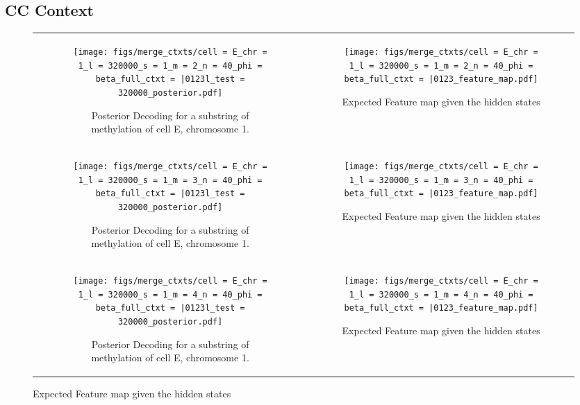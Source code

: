 \documentclass{article}
\begin{document}
\subsection{CC Context}

\begin{figure}[H]
    \begin{tabular}{cc}
      \begin{subfigure}[t]{0.4\textwidth}
        \texttt{[image: figs/merge\_ctxts/cell = E\_chr = 1\_l = 320000\_s = 1\_m = 2\_n = 40\_phi = beta\_full\_ctxt = |0123l\_test = 320000\_posterior.pdf]}
        \caption{Posterior Decoding for a substring of methylation of cell E, chromosome 1.}
      \end{subfigure}
      &
      \begin{subfigure}[t]{0.4\textwidth}
        \texttt{[image: figs/merge\_ctxts/cell = E\_chr = 1\_l = 320000\_s = 1\_m = 2\_n = 40\_phi = beta\_full\_ctxt = |0123\_feature\_map.pdf]}
        \caption{Expected Feature map given the hidden states}
      \end{subfigure}
      \\
      \begin{subfigure}[t]{0.4\textwidth}
        \texttt{[image: figs/merge\_ctxts/cell = E\_chr = 1\_l = 320000\_s = 1\_m = 3\_n = 40\_phi = beta\_full\_ctxt = |0123l\_test = 320000\_posterior.pdf]}
        \caption{Posterior Decoding for a substring of methylation of cell E, chromosome 1.}
      \end{subfigure}
      &
      \begin{subfigure}[t]{0.4\textwidth}
        \texttt{[image: figs/merge\_ctxts/cell = E\_chr = 1\_l = 320000\_s = 1\_m = 3\_n = 40\_phi = beta\_full\_ctxt = |0123\_feature\_map.pdf]}
        \caption{Expected Feature map given the hidden states}
      \end{subfigure}
      \\
      \begin{subfigure}[t]{0.4\textwidth}
        \texttt{[image: figs/merge\_ctxts/cell = E\_chr = 1\_l = 320000\_s = 1\_m = 4\_n = 40\_phi = beta\_full\_ctxt = |0123l\_test = 320000\_posterior.pdf]}
        \caption{Posterior Decoding for a substring of methylation of cell E, chromosome 1.}
      \end{subfigure}
      &
      \begin{subfigure}[t]{0.4\textwidth}
        \texttt{[image: figs/merge\_ctxts/cell = E\_chr = 1\_l = 320000\_s = 1\_m = 4\_n = 40\_phi = beta\_full\_ctxt = |0123\_feature\_map.pdf]}
        \caption{Expected Feature map given the hidden states}
      \end{subfigure}
    \end{tabular}
  \end{figure}
\end{document}
